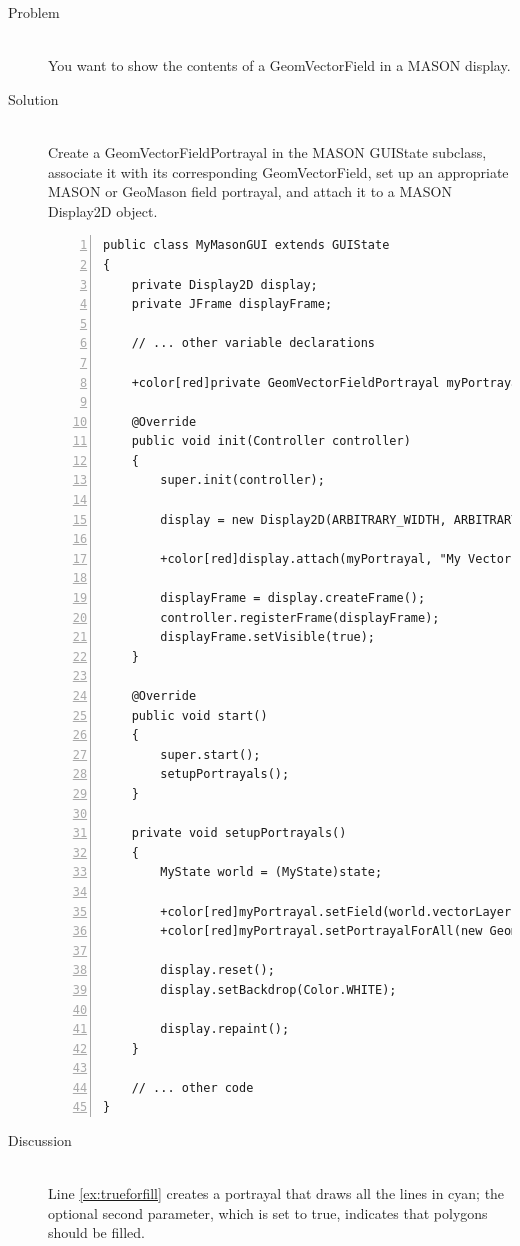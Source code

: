 \documentclass[twoside,10pt]{book}
\newcommand\code[1]{\textsf{#1}}
\begin{document}
\begin{description}
\item[Problem]~\\
You want to show the contents of a \code{GeomVectorField} in a
MASON display.

\item[Solution]~\\
Create a \code{GeomVectorFieldPortrayal} in the MASON \code{GUIState}
subclass, associate it with its corresponding \code{GeomVectorField},
set up an appropriate MASON or GeoMason field portrayal, and attach it
to a MASON \code{Display2D} object.

\begin{Verbatim}[frame=lines,framesep=5mm,numbers=left,commandchars=+\[\]]
public class MyMasonGUI extends GUIState
{
    private Display2D display;
    private JFrame displayFrame;

    // ... other variable declarations

    +color[red]private GeomVectorFieldPortrayal myPortrayal = new GeomVectorFieldPortrayal();

    @Override
    public void init(Controller controller)
    {
        super.init(controller);

        display = new Display2D(ARBITRARY_WIDTH, ARBITRARY_HEIGHT, this);

        +color[red]display.attach(myPortrayal, "My Vector Layer");

        displayFrame = display.createFrame();
        controller.registerFrame(displayFrame);
        displayFrame.setVisible(true);
    }

    @Override
    public void start()
    {
        super.start();
        setupPortrayals();
    }

    private void setupPortrayals()
    {
        MyState world = (MyState)state;

        +color[red]myPortrayal.setField(world.vectorLayer);
        +color[red]myPortrayal.setPortrayalForAll(new GeomPortrayal(Color.CYAN, true));+label[ex:trueforfill]

        display.reset();
        display.setBackdrop(Color.WHITE);

        display.repaint();
    }

    // ... other code
}
\end{Verbatim}

\item[Discussion ]~\\

Line \ref{ex:trueforfill} creates a portrayal that draws all the lines
in cyan; the optional second parameter, which is set to \code{true}, indicates
that polygons should be filled.

\end{description}
\end{document}

